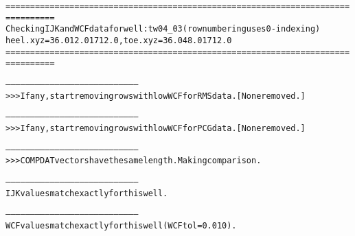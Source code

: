 \begin{alltt}
================================================================================
Checking IJK and WCF data for well: tw04_03 (row numbering uses 0-indexing)
heel.xyz = 36.0 12.0 1712.0, toe.xyz = 36.0 48.0 1712.0
================================================================================

--------------------------------------------------------------------------------
>>> If any, start removing rows with low WCF for RMS data. [None removed.]

--------------------------------------------------------------------------------
>>> If any, start removing rows with low WCF for PCG data. [None removed.]

--------------------------------------------------------------------------------
>>> COMPDAT vectors have the same length. Making comparison.

--------------------------------------------------------------------------------
IJK values match exactly for this well.

--------------------------------------------------------------------------------
WCF values match exactly for this well (WCF tol = 0.010).
\end{alltt}
